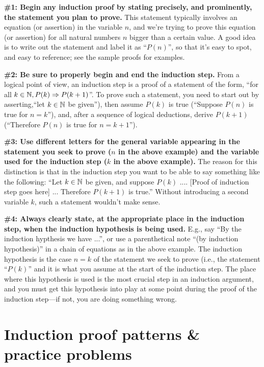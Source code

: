 \noindent
 \textbf{\#1: Begin any induction proof by stating precisely, 
and prominently, the
statement  you plan to prove.} 
This statement typically involves an equation (or assertion) in the variable $n$, and we're trying to prove this equation (or assertion) for all natural numbers $n$ bigger than a certain value.  A good idea is to write out the statement and label it as ``$P(n)$'', so that it's easy to spot, and easy to reference; see the sample proofs for
examples.

\noindent
\textbf{\#2: Be sure to properly begin and end the induction step.} 
From a logical point of view, an induction step is a proof of a statement of the
form, ``for all  $ k\in\mathbb{N}, P(k)\Rightarrow P(k+1)$''. To prove such a statement,
you need to start out by asserting,``let $k\in \mathbb{N}$ be
given''), then assume $P(k)$ is true (``Suppose $P(n)$ is true for $n=k$''), 
and, after a sequence of logical deductions, derive $P(k+1)$ (``Therefore
$P(n)$ is true for $n=k+1$''). 

\noindent
 \textbf{\#3: Use different letters for the general variable appearing in the
statement you seek to prove ($n$ in the above example)
and the variable used for the induction step 
($k$ in the above example).} 
The reason for this distinction is that in the induction step 
you want to be able to say something like the following:
``Let $k\in\mathbb{N}$ be given, and suppose $P(k)$ .... 
[Proof of induction step goes here] ...  
Therefore $P(k+1)$ is true.''  Without introducing a second variable
$k$, such a statement wouldn't make sense.

\noindent
\textbf{\#4: Always clearly state, at the appropriate place in the induction step,
when the induction hypothesis is being used.} E.g., say
``By the induction hypthesis we have ...'', or use a parenthetical
note ``(by induction hypothesis)'' in a chain of equations as in the above
example.  The induction hypothesis is the case $n=k$ of the statement we seek
to prove (i.e., the statement ``$P(k)$'' and it is what you assume at the
start of the induction step.  The place where this hypothesis is used is the
most crucial step in an induction argument, and you must get this hypothesis into
play at some point during the proof of the induction step---if not, you are
doing something wrong. 


\section{Induction proof patterns \& practice problems} 


